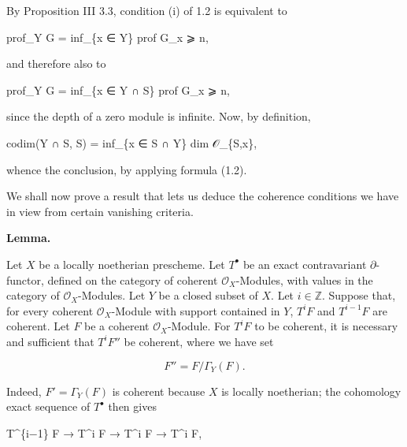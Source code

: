 \documentclass[
]{article}
\newenvironment{Shaded}{}{}
\newcommand{\NormalTok}[1]{#1}
\begin{document}
By Proposition III 3.3, condition (i) of 1.2 is equivalent to

\begin{Shaded}
\begin{Highlighting}[]
\NormalTok{prof\_Y G = inf\_\{x ∈ Y\} prof G\_x ⩾ n,}
\end{Highlighting}
\end{Shaded}

and therefore also to

\begin{Shaded}
\begin{Highlighting}[]
\NormalTok{prof\_Y G = inf\_\{x ∈ Y ∩ S\} prof G\_x ⩾ n,}
\end{Highlighting}
\end{Shaded}

since the depth of a zero module is infinite. Now, by definition,

\begin{Shaded}
\begin{Highlighting}[]
\NormalTok{codim(Y ∩ S, S) = inf\_\{x ∈ S ∩ Y\} dim 𝒪\_\{S,x\},}
\end{Highlighting}
\end{Shaded}

whence the conclusion, by applying formula (1.2).

We shall now prove a result that lets us deduce the coherence conditions
we have in view from certain vanishing criteria.

\textbf{Lemma.}

Let \(X\) be a locally noetherian prescheme. Let \(T^{\bullet}\) be an
exact contravariant \(\partial\)-functor, defined on the category of
coherent \(\mathcal{O}_{X}\)-Modules, with values in the category of
\(\mathcal{O}_{X}\)-Modules. Let \(Y\) be a closed subset of \(X\). Let
\(i \in \mathbb{Z}\). Suppose that, for every coherent
\(\mathcal{O}_{X}\)-Module with support contained in \(Y\), \(T^{i} F\)
and \(T^{i-1} F\) are coherent. Let \(F\) be a coherent
\(\mathcal{O}_{X}\)-Module. For \(T^{i} F\) to be coherent, it is
necessary and sufficient that \(T^{i} F''\) be coherent, where we have
set

\[
F'' = F/\Gamma_{Y}(F).
\]

Indeed, \(F' = \Gamma_{Y}(F)\) is coherent because \(X\) is locally
noetherian; the cohomology exact sequence of \(T^{\bullet}\) then gives

\begin{Shaded}
\begin{Highlighting}[]
\NormalTok{T\^{}\{i−1\} F\textquotesingle{} → T\^{}i F\textquotesingle{}\textquotesingle{} → T\^{}i F → T\^{}i F\textquotesingle{},}
\end{Highlighting}
\end{Shaded}
\end{document}

